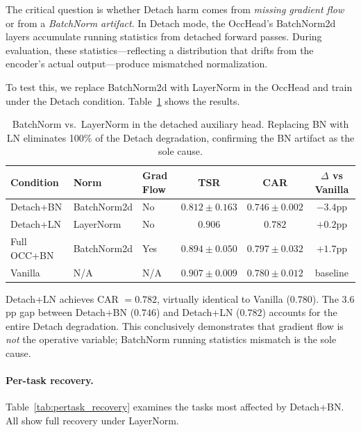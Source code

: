 \documentclass[10pt,letterpaper]{article}
\begin{document}
The critical question is whether Detach harm comes from \emph{missing gradient flow} or from a \emph{BatchNorm artifact}. In Detach mode, the OccHead's BatchNorm2d layers accumulate running statistics from detached forward passes. During evaluation, these statistics---reflecting a distribution that drifts from the encoder's actual output---produce mismatched normalization.

To test this, we replace BatchNorm2d with LayerNorm in the OccHead and train under the Detach condition. Table~\ref{tab:bn_ln} shows the results.

\begin{table}[h]
\centering
\caption{BatchNorm vs.\ LayerNorm in the detached auxiliary head. Replacing BN with LN eliminates 100\% of the Detach degradation, confirming the BN artifact as the sole cause.}
\label{tab:bn_ln}
\begin{tabular}{lllccc}
\toprule
\textbf{Condition} & \textbf{Norm} & \textbf{Grad Flow} & \textbf{TSR} & \textbf{CAR} & \textbf{$\Delta$ vs Vanilla} \\
\midrule
Detach+BN  & BatchNorm2d & No  & $0.812 \pm 0.163$ & $0.746 \pm 0.002$ & $-3.4$pp \\
Detach+LN  & LayerNorm   & No  & $0.906$           & $0.782$           & $+0.2$pp \\
Full OCC+BN & BatchNorm2d & Yes & $0.894 \pm 0.050$ & $0.797 \pm 0.032$ & $+1.7$pp \\
Vanilla    & N/A         & N/A & $0.907 \pm 0.009$ & $0.780 \pm 0.012$ & baseline \\
\bottomrule
\end{tabular}
\end{table}

Detach+LN achieves CAR $= 0.782$, virtually identical to Vanilla ($0.780$). The $3.6$pp gap between Detach+BN ($0.746$) and Detach+LN ($0.782$) accounts for the entire Detach degradation. This conclusively demonstrates that gradient flow is \emph{not} the operative variable; BatchNorm running statistics mismatch is the sole cause.

\paragraph{Per-task recovery.} Table~\ref{tab:pertask_recovery} examines the tasks most affected by Detach+BN. All show full recovery under LayerNorm.
\end{document}
